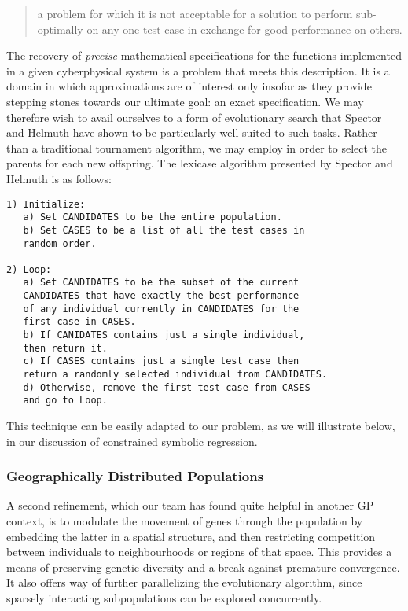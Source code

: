 \documentclass[11pt]{article}
\begin{document}
\begin{quote}
a problem for which it is not acceptable for a solution to perform sub-optimally on any one test case in exchange for good performance on others. \cite{helmuth2015}
\end{quote}

The recovery of \emph{precise} mathematical specifications for the functions implemented in a given cyberphysical system is a problem that meets this description. It is a domain in which approximations are of interest only insofar as they provide stepping stones towards our ultimate goal: an exact specification. We may therefore wish to avail ourselves to a form of evolutionary search that Spector and Helmuth have shown to be particularly well-suited to such tasks. Rather than a traditional tournament algorithm, we may employ \cite[lexicase selection]{helmuth2015} in order to select the parents for each new offspring. The lexicase algorithm presented by Spector and Helmuth is as follows:

\begin{verbatim}
1) Initialize:
   a) Set CANDIDATES to be the entire population.
   b) Set CASES to be a list of all the test cases in
   random order.

2) Loop:
   a) Set CANDIDATES to be the subset of the current
   CANDIDATES that have exactly the best performance
   of any individual currently in CANDIDATES for the
   first case in CASES.
   b) If CANIDATES contains just a single individual,
   then return it.
   c) If CASES contains just a single test case then
   return a randomly selected individual from CANDIDATES.
   d) Otherwise, remove the first test case from CASES
   and go to Loop.
\end{verbatim}

This technique can be easily adapted to our problem, as we will illustrate below, in our discussion of \hyperref[sec:org22f5e69]{constrained symbolic regression.}

\subsubsection{Geographically Distributed Populations}
\label{sec:org55cc8dc}
A second refinement, which our team has found quite helpful in another GP context, is to modulate the movement of genes through the population by embedding the latter in a spatial structure, and then restricting competition between individuals to neighbourhoods or regions of that space. This provides a means of preserving genetic diversity and a break against premature convergence. It also offers way of further parallelizing the evolutionary algorithm, since sparsely interacting subpopulations can be explored concurrently.
\end{document}
